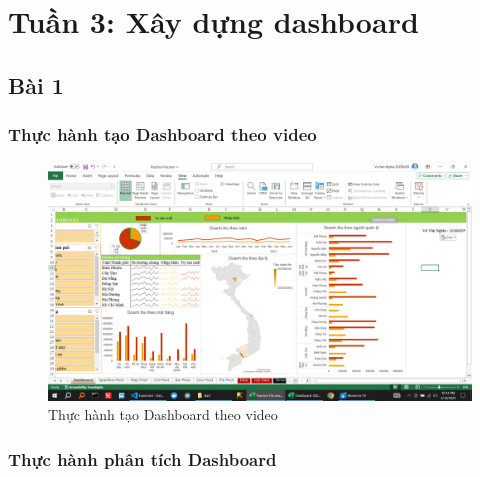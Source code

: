 \documentclass{article}
\begin{document}
\tableofcontents
\newpage
\listoffigures
\newpage
\section{Tuần 3: Xây dựng dashboard}
\subsection{Bài 1}

\subsubsection{Thực hành tạo Dashboard theo video}

\begin{figure}[H]
\centering
\includegraphics[scale = 0.15]{Bai1/ThucHanh/0.png}
\caption{Thực hành tạo Dashboard theo video}
\end{figure}

\subsubsection{Thực hành phân tích Dashboard}
\end{document}
